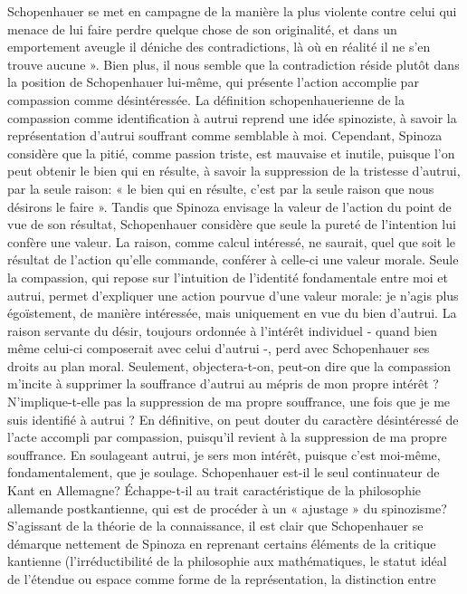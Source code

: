 Schopenhauer se met en campagne de la manière la plus violente contre celui qui menace de lui faire perdre
quelque chose de son originalité, et dans un emportement aveugle il déniche des contradictions, là où en
réalité il ne s’en trouve aucune ». Bien plus, il nous semble que la contradiction réside plutôt dans la
position de Schopenhauer lui-même, qui présente l’action accomplie par compassion comme désintéressée.
La définition schopenhauerienne de la compassion comme identification à autrui reprend une idée
spinoziste, à savoir la représentation d’autrui souffrant comme semblable à moi.
Cependant, Spinoza considère que la pitié, comme passion triste, est mauvaise et inutile, puisque l’on peut
obtenir le bien qui en résulte, à savoir la suppression de la tristesse d’autrui, par la
seule raison: « le bien qui en résulte, c’est par la seule raison que nous désirons le faire ».
Tandis que Spinoza envisage la valeur de l’action du point de vue de son résultat, Schopenhauer considère
que seule la pureté de l’intention lui confère une valeur. La raison, comme calcul intéressé, ne saurait, quel
que soit le résultat de l’action qu’elle commande, conférer à celle-ci une valeur morale. Seule la
compassion, qui repose sur l’intuition de l’identité fondamentale entre moi et autrui, permet d’expliquer une
action pourvue d’une valeur morale: je n’agis plus égoïstement, de manière intéressée, mais uniquement en
vue du bien d’autrui. La raison servante du désir, toujours ordonnée à l’intérêt individuel - quand bien même
celui-ci composerait avec celui d’autrui -, perd avec Schopenhauer ses droits au plan moral.
Seulement, objectera-t-on, peut-on dire que la compassion m’incite à supprimer la souffrance d’autrui au
mépris de mon propre intérêt ? N’implique-t-elle pas la suppression de ma propre souffrance, une fois que je
me suis identifié à autrui ? En définitive, on peut douter du caractère désintéressé de l’acte accompli par
compassion, puisqu’il revient à la suppression de ma propre souffrance. En soulageant autrui, je sers mon
intérêt, puisque c’est moi-même, fondamentalement, que je soulage.
Schopenhauer est-il le seul continuateur de Kant en Allemagne? Échappe-t-il au trait caractéristique de la
philosophie allemande postkantienne, qui est de procéder à un « ajustage » du spinozisme?
S’agissant de la théorie de la connaissance, il est clair que Schopenhauer se démarque nettement de
Spinoza en reprenant certains éléments de la critique kantienne (l’irréductibilité de la philosophie aux
mathématiques, le statut idéal de l’étendue ou espace comme forme de la représentation, la distinction entre
